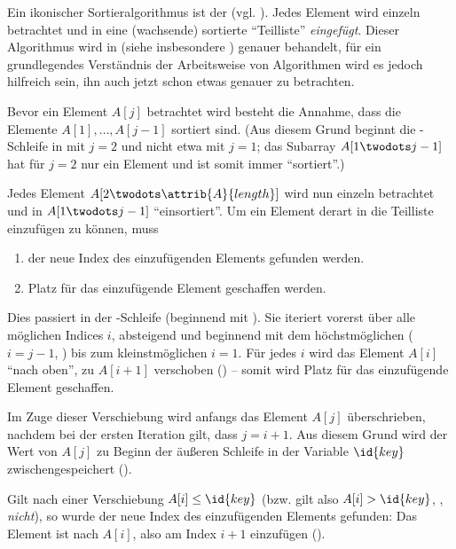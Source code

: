 Ein ikonischer Sortieralgorithmus ist der  (vgl. \cite[74]{taocp3}). Jedes Element wird einzeln betrachtet und in eine (wachsende) sortierte \enquote{Teilliste} \emph{eingefügt}. Dieser Algorithmus wird in  (siehe insbesondere ) genauer behandelt, für ein grundlegendes Verständnis der Arbeitsweise von Algorithmen wird es jedoch hilfreich sein, ihn auch jetzt schon etwas genauer zu betrachten.



Bevor ein Element $A[j]$ betrachtet wird besteht die Annahme, dass die Elemente $A[1], \ldots, A[j - 1]$ sortiert sind. (Aus diesem Grund beginnt die \For-Schleife in  mit $j = 2$ und nicht etwa mit $j = 1$; das Subarray $A[1 \twodots j - 1]$ hat für $j = 2$ nur ein Element und ist somit immer \enquote{sortiert}.)

Jedes Element $A[2 \twodots \attrib{A}{length}]$ wird nun einzeln betrachtet und in $A[1 \twodots j - 1]$ \enquote{einsortiert}. Um ein Element derart in die Teilliste einzufügen zu können, muss
\begin{enumerate}[nosep, label=(\alph*)]
    \item der neue Index des einzufügenden Elements gefunden werden.
    \item Platz für das einzufügende Element geschaffen werden.
\end{enumerate}
Dies passiert in der \While-Schleife (beginnend mit ). Sie iteriert vorerst über alle möglichen Indices $i$, absteigend und beginnend mit dem höchstmöglichen ($i = j - 1$, ) bis zum kleinstmöglichen $i = 1$. Für jedes $i$ wird das Element $A[i]$ \enquote{nach oben}, zu $A[i + 1]$ verschoben () -- somit wird Platz für das einzufügende Element geschaffen. 

Im Zuge dieser Verschiebung wird anfangs das Element $A[j]$ überschrieben, nachdem bei der ersten Iteration gilt, dass $j = i + 1$. Aus diesem Grund wird der Wert von $A[j]$ zu Beginn der äußeren Schleife in der Variable $\id{key}$ zwischengespeichert ().

Gilt nach einer Verschiebung $A[i] \leq \id{key}$ (bzw. gilt also $A[i] > \id{key}$, , \emph{nicht}), so wurde der neue Index des einzufügenden Elements gefunden: Das Element ist nach $A[i]$, also am Index $i + 1$ einzufügen ().

